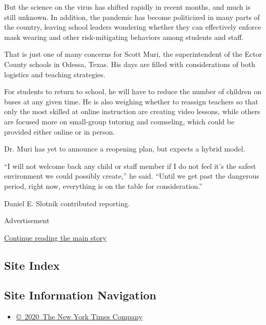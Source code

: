 But the science on the virus has shifted rapidly in recent months, and
much is still unknown. In addition, the pandemic has become politicized
in many parts of the country, leaving school leaders wondering whether
they can effectively enforce mask wearing and other risk-mitigating
behaviors among students and staff.

That is just one of many concerns for Scott Muri, the superintendent of
the Ector County schools in Odessa, Texas. His days are filled with
considerations of both logistics and teaching strategies.

For students to return to school, he will have to reduce the number of
children on buses at any given time. He is also weighing whether to
reassign teachers so that only the most skilled at online instruction
are creating video lessons, while others are focused more on small-group
tutoring and counseling, which could be provided either online or in
person.

Dr. Muri has yet to announce a reopening plan, but expects a hybrid
model.

``I will not welcome back any child or staff member if I do not feel
it's the safest environment we could possibly create,'' he said. ``Until
we get past the dangerous period, right now, everything is on the table
for consideration.''

Daniel E. Slotnik contributed reporting.

Advertisement

\protect\hyperlink{after-bottom}{Continue reading the main story}

\hypertarget{site-index}{%
\subsection{Site Index}\label{site-index}}

\hypertarget{site-information-navigation}{%
\subsection{Site Information
Navigation}\label{site-information-navigation}}

\begin{itemize}
\tightlist
\item
  \href{https://help.nytimes.com/hc/en-us/articles/115014792127-Copyright-notice}{©~2020~The
  New York Times Company}
\end{itemize}

